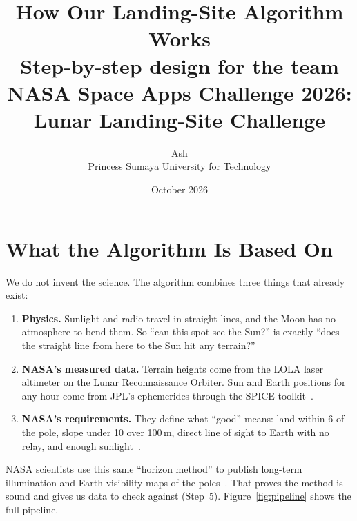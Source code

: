 \documentclass[11pt,a4paper]{article}
\title{How Our Landing-Site Algorithm Works\\[4pt]
\large Step-by-step design for the team\\
NASA Space Apps Challenge 2026: Lunar Landing-Site Challenge}
\author{Ash\\Princess Sumaya University for Technology}
\date{October 2026}
\begin{document}
\maketitle

\section{What the Algorithm Is Based On}

We do not invent the science. The algorithm combines three things that already exist:

\begin{enumerate}
  \item \textbf{Physics.} Sunlight and radio travel in straight lines, and the Moon has no atmosphere to bend them. So ``can this spot see the Sun?'' is exactly ``does the straight line from here to the Sun hit any terrain?''
  \item \textbf{NASA's measured data.} Terrain heights come from the LOLA laser altimeter on the Lunar Reconnaissance Orbiter. Sun and Earth positions for any hour come from JPL's ephemerides through the SPICE toolkit~\cite{spice}.
  \item \textbf{NASA's requirements.} They define what ``good'' means: land within 6\textdegree{} of the pole, slope under 10\textdegree{} over 100\,m, direct line of sight to Earth with no relay, and enough sunlight~\cite{nasa-artemis}.
\end{enumerate}

NASA scientists use this same ``horizon method'' to publish long-term illumination and Earth-visibility maps of the poles~\cite{pgda}. That proves the method is sound and gives us data to check against (Step~5). Figure~\ref{fig:pipeline} shows the full pipeline.
\end{document}
